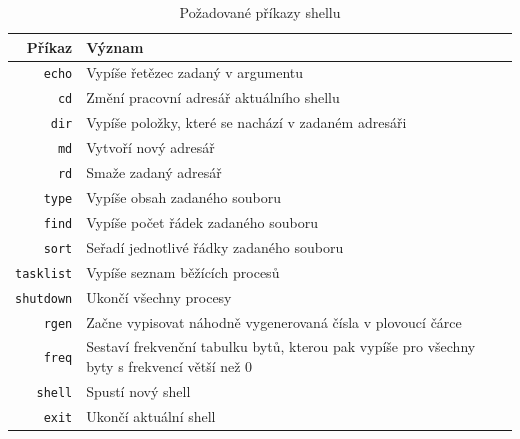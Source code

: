 \documentclass[12pt, a4paper]{article}
\begin{document}
\begin{table}[!ht]
\centering
\begin{tabularx}{\textwidth}{r|p{11cm}}
\textbf{Příkaz} & \textbf{Význam}                                                                                                                 
\\
\hline
\texttt{echo}            & Vypíše řetězec zadaný v argumentu                                                                                                \\
\texttt{cd}              & Změní pracovní adresář aktuálního shellu                                                                                         \\
\texttt{dir}             & Vypíše položky, které se nachází v zadaném adresáři                                                                              \\
\texttt{md}              & Vytvoří nový adresář                                                                                                             \\
\texttt{rd}              & Smaže zadaný adresář
\\
\texttt{type}            & Vypíše obsah zadaného souboru                                                                                                    \\
\texttt{find}            & Vypíše počet řádek zadaného souboru                                                                                              \\
\texttt{sort}            & Seřadí jednotlivé řádky zadaného souboru                                                                                         \\
\texttt{tasklist}        & Vypíše seznam běžících procesů                                                                                                   \\
\texttt{shutdown}        & Ukončí všechny procesy                                                                                                           \\
\texttt{rgen}            & Začne vypisovat náhodně vygenerovaná čísla v plovoucí čárce                                                                      \\
\texttt{freq}            & Sestaví frekvenční tabulku bytů, kterou pak vypíše pro všechny byty s frekvencí větší než 0
\\
\texttt{shell}			 & Spustí nový shell
\\
\texttt{exit}			 & Ukončí aktuální shell
\end{tabularx}
\caption{Požadované příkazy shellu}
\label{tabCommands}
\end{table}
\end{document}
